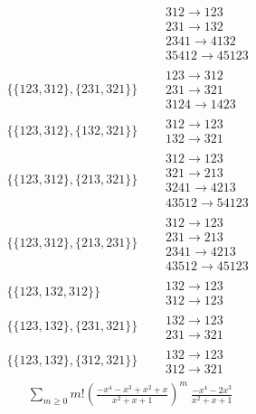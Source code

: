 \begin{tiny}
\begin{align}
\quad
&
\begin{matrix}
312 \to 123\\231 \to 132\\2341 \to 4132\\35412 \to 45123
\end{matrix}
\\
\{\{123, 312\}, \{231, 321\}\}
\quad
&
\begin{matrix}
123 \to 312\\231 \to 321\\3124 \to 1423
\end{matrix}
\\
\{\{123, 312\}, \{132, 321\}\}
\quad
&
\begin{matrix}
312 \to 123\\132 \to 321
\end{matrix}
\\
\{\{123, 312\}, \{213, 321\}\}
\quad
&
\begin{matrix}
312 \to 123\\321 \to 213\\3241 \to 4213\\43512 \to 54123
\end{matrix}
\\
\{\{123, 312\}, \{213, 231\}\}
\quad
&
\begin{matrix}
312 \to 123\\231 \to 213\\2341 \to 4213\\43512 \to 45123
\end{matrix}
\\
\{\{123, 132, 312\}\}
\quad
&
\begin{matrix}
132 \to 123\\312 \to 123
\end{matrix}
\\
\{\{123, 132\}, \{231, 321\}\}
\quad
&
\begin{matrix}
132 \to 123\\231 \to 321
\end{matrix}
\\
\{\{123, 132\}, \{312, 321\}\}
\quad
&
\begin{matrix}
132 \to 123\\312 \to 321
\end{matrix}
\end{align}
$$
\begin{matrix}
\sum_{m \geq 0} m! \left(
\frac{-x^{4} - x^{3} + x^{2} + x}{x^{2} + x + 1}
\right)^m
\ 
\frac{-x^{4} - 2 x^{3}}{x^{2} + x + 1}
\\

\end{matrix}$$
\end{tiny}
